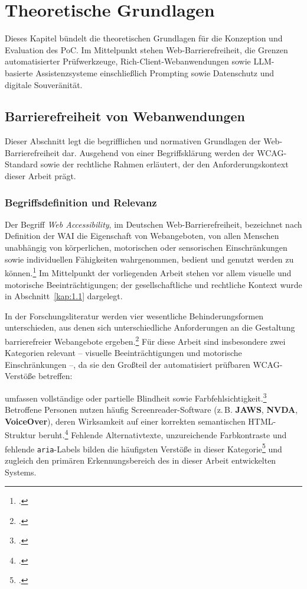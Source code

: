 \chapter{Theoretische Grundlagen} \label{kap:2}

Dieses Kapitel bündelt die theoretischen Grundlagen für die Konzeption und Evaluation des \acf{PoC}. Im Mittelpunkt stehen Web-Barrierefreiheit, die Grenzen automatisierter Prüfwerkzeuge, Rich-Client-Webanwendungen sowie \acs{LLM}-basierte Assistenzsysteme einschließlich \mbox{Prompting} sowie Datenschutz und digitale Souveränität.

\section{Barrierefreiheit von Webanwendungen} \label{kap:2.1}

Dieser Abschnitt legt die begrifflichen und normativen Grundlagen der Web-Barrierefreiheit dar. Ausgehend von einer Begriffsklärung werden der \ac{WCAG}-Standard sowie der rechtliche Rahmen erläutert, der den Anforderungskontext dieser Arbeit prägt.

\subsection{Begriffsdefinition und Relevanz}

Der Begriff \textit{Web Accessibility}, im Deutschen Web-Barrierefreiheit, bezeichnet nach Definition der \ac{WAI} die Eigenschaft von Webangeboten, von allen Menschen unabhängig von körperlichen, motorischen oder sensorischen Einschränkungen sowie individuellen Fähigkeiten wahrgenommen, bedient und genutzt werden zu können.\footcite[Vgl.][S. 172]{abuaddousWebAccessibilityChallenges2016} Im Mittelpunkt der vorliegenden Arbeit stehen vor allem visuelle und motorische Beeinträchtigungen; der gesellschaftliche und rechtliche Kontext wurde in Abschnitt~\ref{kap:1.1} dargelegt.

In der Forschungsliteratur werden vier wesentliche Behinderungsformen unterschieden, aus denen sich unterschiedliche Anforderungen an die Gestaltung barrierefreier Webangebote ergeben.\footcite[Vgl.][S. 493--494]{ResearchMethodsHumanComputer2017} Für diese Arbeit sind insbesondere zwei Kategorien relevant -- visuelle Beeinträchtigungen und motorische Einschränkungen --, da sie den Großteil der automatisiert prüfbaren \ac{WCAG}-Verstöße betreffen:

 umfassen vollständige oder partielle Blindheit sowie Farbfehlsichtigkeit.\footcite[Vgl.][]{gubbi_mohanbabu_context-aware_2024} Betroffene Personen nutzen häufig Screenreader-Software (z.\,B. \textbf{JAWS}, \textbf{NVDA}, \textbf{VoiceOver}), deren Wirksamkeit auf einer korrekten semantischen \acs{HTML}-Struktur beruht.\footcite[Vgl.][S. 5508]{morrisMostItBeing2016} Fehlende Alternativtexte, unzureichende Farbkontraste und fehlende \texttt{aria}-Labels bilden die häufigsten Verstöße in dieser Kategorie\footcite[Vgl.][Erfolgskriterium 1.1.1]{WCAG} und zugleich den primären Erkennungsbereich des in dieser Arbeit entwickelten Systems.

